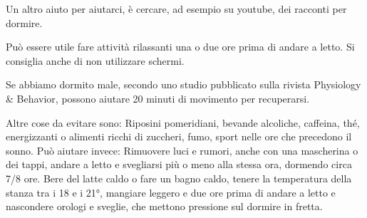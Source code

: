 \documentclass[12pt]{book} %
\begin{document}
\begin{mdframed}[linewidth=1pt]
Un altro aiuto per aiutarci, è cercare, ad esempio su youtube, dei racconti per dormire.

Può essere utile fare attività rilassanti una o due ore prima di andare a letto. Si consiglia anche di non utilizzare schermi.

Se abbiamo dormito male, secondo uno studio pubblicato sulla rivista Physiology \& Behavior, possono aiutare 20 minuti di movimento per recuperarsi.

Altre cose da evitare sono: Riposini pomeridiani, bevande alcoliche, caffeina, thé, energizzanti o alimenti ricchi di zuccheri, fumo, sport nelle ore che precedono il sonno.
Può aiutare invece: Rimuovere luci e rumori, anche con una mascherina o dei tappi, andare a letto e svegliarsi più o meno alla stessa ora, dormendo circa 7/8 ore. Bere del latte caldo o fare un bagno caldo, tenere la temperatura della stanza tra i 18 e i 21°, mangiare leggero e due ore prima di andare a letto e nascondere orologi e sveglie, che mettono pressione sul dormire in fretta.
\end{mdframed}
\end{document}
